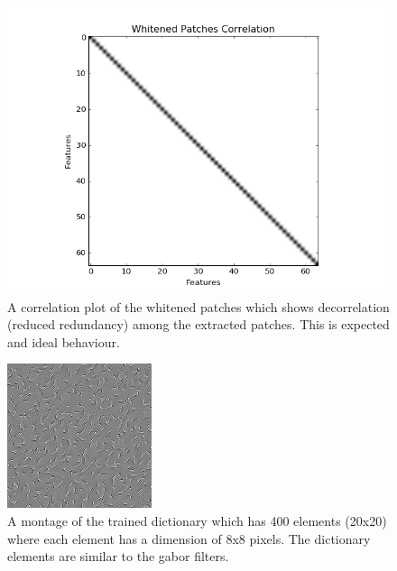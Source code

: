 \documentclass[	DIV=calc,%
				paper=a4,%
				fontsize=11pt,%
				twocolumn]{scrartcl}	 %
\begin{document}
 
\begin{figure}[H]
    \centering
    \includegraphics[width=0.9\linewidth]{data/sc_data/sc_mnist_whitened_patches_correlation.png}
    \caption{A correlation plot of the whitened patches which shows decorrelation (reduced redundancy) among the extracted patches. This is expected and ideal behaviour.}
    \label{sc_mnist_whitened_patches_correlation}
\end{figure}

\begin{figure}[H]
    \centering
    \includegraphics[width=0.55\linewidth]{data/sc_data/sc_mnist_dictionary.jpg}
    \caption{A montage of the trained dictionary which has 400 elements (20x20) where each element has a dimension of 8x8 pixels. The dictionary elements are similar to the gabor filters.}
    \label{sc_mnist_dictionary}
\end{figure}
\end{document}
